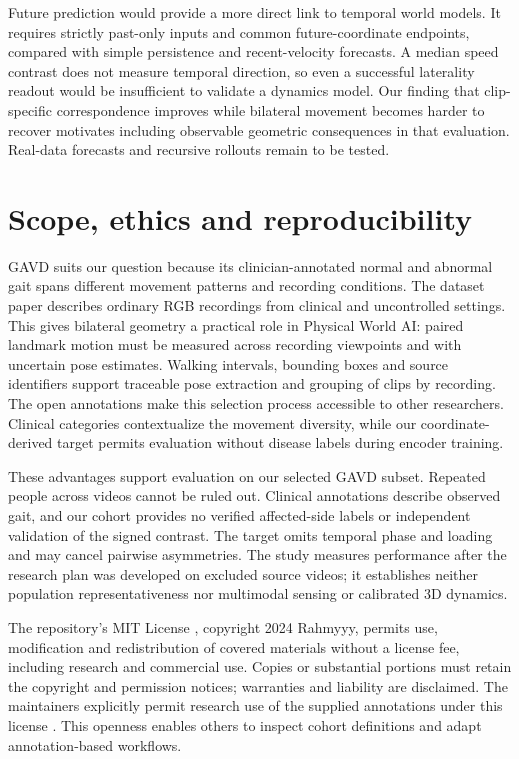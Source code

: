 \documentclass{article}
\begin{document}
Future prediction would provide a more direct link to temporal world models. It requires strictly past-only inputs and common future-coordinate endpoints, compared with simple persistence and recent-velocity forecasts. A median speed contrast does not measure temporal direction, so even a successful laterality readout would be insufficient to validate a dynamics model. Our finding that clip-specific correspondence improves while bilateral movement becomes harder to recover motivates including observable geometric consequences in that evaluation. Real-data forecasts and recursive rollouts remain to be tested.

\section{Scope, ethics and reproducibility}\label{scope-ethics-and-reproducibility}

GAVD suits our question because its clinician-annotated normal and abnormal gait spans different movement patterns and recording conditions. The dataset paper \citep{ref13} describes ordinary RGB recordings from clinical and uncontrolled settings. This gives bilateral geometry a practical role in Physical World AI: paired landmark motion must be measured across recording viewpoints and with uncertain pose estimates. Walking intervals, bounding boxes and source identifiers support traceable pose extraction and grouping of clips by recording. The open annotations \citep{ref15} make this selection process accessible to other researchers. Clinical categories contextualize the movement diversity, while our coordinate-derived target permits evaluation without disease labels during encoder training.

These advantages support evaluation on our selected GAVD subset. Repeated people across videos cannot be ruled out. Clinical annotations describe observed gait, and our cohort provides no verified affected-side labels or independent validation of the signed contrast. The target omits temporal phase and loading and may cancel pairwise asymmetries. The study measures performance after the research plan was developed on excluded source videos; it establishes neither population representativeness nor multimodal sensing or calibrated 3D dynamics.

The repository's MIT License \citep{ref16}, copyright 2024 Rahmyyy, permits use, modification and redistribution of covered materials without a license fee, including research and commercial use. Copies or substantial portions must retain the copyright and permission notices; warranties and liability are disclaimed. The maintainers explicitly permit research use of the supplied annotations under this license \citep{ref15}. This openness enables others to inspect cohort definitions and adapt annotation-based workflows.
\end{document}
